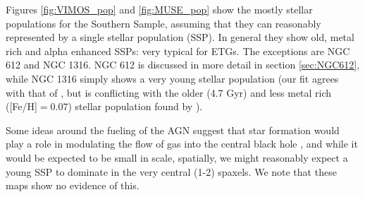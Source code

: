 {{		Figures \ref{fig:VIMOS_pop} and \ref{fig:MUSE_pop} show the mostly stellar populations for the Southern Sample, assuming that they can reasonably represented by a single stellar population (SSP). In general they show old, metal rich and alpha enhanced SSPs: very typical for ETGs. The exceptions are NGC 612 and NGC 1316. NGC 612 is discussed in more detail in section \ref{sec:NGC612}, while NGC 1316 simply shows a very young stellar population (our fit agrees with that of \citet{Kuntschner2000}, but is conflicting with the older (4.7 Gyr) and less metal rich ([Fe/H]$ = 0.07$) stellar population found by \citet{Koleva2011}). 

		Some ideas around the fueling of the AGN suggest that star formation would play a role in modulating the flow of gas into the central black hole \citep{}, and while it would be expected to be small in scale, spatially, we might reasonably expect a young SSP to dominate in the very central (1-2) spaxels. We note that these maps show no evidence of this. 

}}
